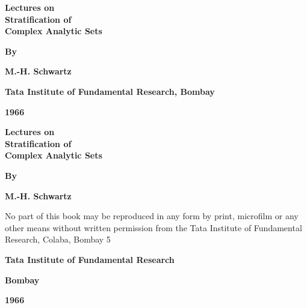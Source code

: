 \thispagestyle{empty}
\begin{center}
{\Large\bf Lectures on}\\[5pt]
{\Large\bf Stratification of}\\[5pt]
{\Large\bf Complex Analytic Sets}
\vskip 1cm

{\bf By}
\medskip

{\large\bf M.-H. Schwartz}
\vfill

{\bf Tata Institute of Fundamental Research, Bombay}

{\bf 1966}
\end{center}
\eject

\thispagestyle{empty}
\begin{center}
{\Large\bf Lectures on}\\[5pt]
{\Large\bf Stratification of}\\[5pt]
{\Large\bf Complex Analytic Sets}
\vskip 1cm

{\bf By}
\medskip

{\large\bf M.-H. Schwartz}
\vfill

\parbox{0.7\textwidth}{No part of this book may be reproduced in any
  form by print, microfilm or any other means without written
  permission from the Tata Institute of Fundamental Research, Colaba,
  Bombay 5}
\vfill

{\bf Tata Institute of Fundamental Research}

{\bf Bombay}

{\bf 1966}
\end{center}
\eject


